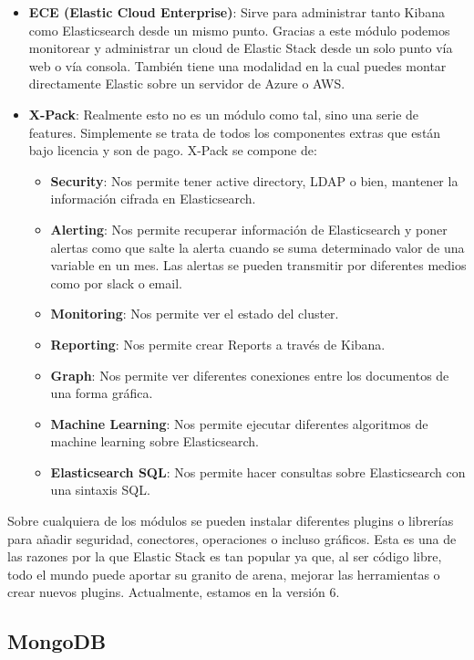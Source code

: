 \begin{itemize}
	\item \textbf{ECE (Elastic Cloud Enterprise)}: Sirve para administrar tanto Kibana como Elasticsearch desde un mismo punto. Gracias a este módulo podemos monitorear y administrar un cloud de Elastic Stack desde un solo punto vía web o vía consola. También tiene una modalidad en la cual puedes montar directamente Elastic sobre un servidor de Azure o AWS.
	\item \textbf{X-Pack}: Realmente esto no es un módulo como tal, sino una serie de features. Simplemente se trata de todos los componentes extras que están bajo licencia y son de pago. X-Pack se compone de:
\begin{itemize}
	\item \textbf{Security}: Nos permite tener active directory, LDAP o bien, mantener la información cifrada en Elasticsearch. 
	\item \textbf{Alerting}: Nos permite recuperar información de Elasticsearch y poner alertas como que salte la alerta cuando se suma determinado valor de una variable en un mes. Las alertas se pueden transmitir por diferentes medios como por slack o email.
	\item \textbf{Monitoring}: Nos permite ver el estado del cluster.
	\item \textbf{Reporting}: Nos permite crear Reports a través de Kibana.
	\item \textbf{Graph}: Nos permite ver diferentes conexiones entre los documentos de una forma gráfica.
	\item \textbf{Machine Learning}: Nos permite ejecutar diferentes algoritmos de machine learning sobre Elasticsearch.
	\item\textbf{ Elasticsearch SQL}: Nos permite hacer consultas sobre Elasticsearch con una sintaxis SQL.
\end{itemize}
\end{itemize}
Sobre cualquiera de los módulos se pueden instalar diferentes plugins o librerías para añadir seguridad, conectores, operaciones o incluso gráficos. Esta es una de las razones por la que Elastic Stack es tan popular ya que, al ser código libre, todo el mundo puede aportar su granito de arena, mejorar las herramientas o crear nuevos plugins. Actualmente, estamos en la versión 6.

\subsection{MongoDB\label{MongoDB}}
